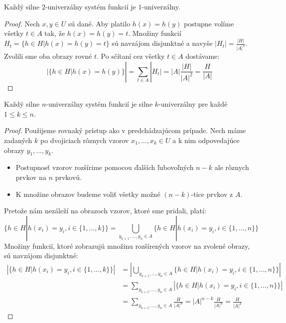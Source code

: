 \begin{remark}
Každý silne $2$-univerzálny systém funkcií je $1$-univerzálny.
\end{remark}
\begin{proof}
Nech $x, y \in U$ sú dané. Aby platilo $h(x) = h(y)$ postupne volíme všetky $t \in A$ tak, že $h(x) = h(y) = t$. Množiny funkcií $H_t = \lbrace h \in H | h(x) = h(y) = t \rbrace$ sú navzájom disjunktné a navyše $|H_t| = \frac{|H|}{{|A|}^{2}}$. Zvolili sme oba obrazy rovné $t$. Po sčítaní cez všetky $t \in A$ dostávame:
\begin{displaymath}
|\lbrace h \in H | h(x) = h(y) \rbrace | = \displaystyle \sum_{t \in A} |H_t| = |A| \frac{|H|}{{|A|}^{2}} = \frac{H}{|A|}
\end{displaymath}
\end{proof}

\begin{remark}
Každý silne $n$-univerzálny systém funkcií je silne $k$-univerzálny pre každé $1 \leq k \leq n$.
\end{remark}
\begin{proof}
Použijeme rovnaký prístup ako v predchádzajúcom prípade. Nech máme zadaných $k$ po dvojiciach rôznych vzorov $x_1, \dots, x_k \in U$ a k nim odpovedajúce obrazy $y_1, \dots, y_k$. 
\begin{itemize}
\item Postupnosť vzorov rozšírime pomocou ďalších ľubovoľných $n - k$ ale rôznych prvkov na $n$ prvkovú. 
\item K množine obrazov budeme voliť všetky možné $(n-k)$-tice prvkov z $A$. 
\end{itemize}
Pretože nám nezáleží na obrazoch vzorov, ktoré sme pridali, platí:
\begin{displaymath}
\lbrace h \in H | h(x_i) = y_i, i \in \lbrace 1, \dots, k \rbrace \rbrace = \displaystyle \bigcup_{y_{k+1}, \dots, y_n \in A} \lbrace h \in H | h(x_i) = y_i, i \in \lbrace 1, \dots, n \rbrace \rbrace
\end{displaymath}
Množiny funkcií, ktoré zobrazujú množinu rozšírených vzorov na zvolené obrazy, sú navzájom disjunktné:
\begin{displaymath}
\begin{split}
\left| \lbrace h \in H | h(x_i) = y_i, i \in \lbrace 1, \dots, k \rbrace \rbrace \right| 
	& = \left| \displaystyle \bigcup_{y_{k+1}, \dots, y_n \in A} \lbrace h \in H | h(x_i) = y_i, i \in \lbrace 1, \dots, n \rbrace \rbrace \right|  \\
	& = \displaystyle \sum_{y_{k+1}, \dots, y_n \in A} \left| \lbrace h \in H | h(x_i) = y_i, i \in \lbrace 1, \dots, n \rbrace \rbrace \right| \\
	& = \displaystyle \sum_{y_{k+1}, \dots, y_n \in A} \frac{H}{{|A|}^{n}} = {|A|}^{n - k} \frac{H}{{|A|}^{n}} = \frac{H}{{|A|}^{k}}
\end{split}
\end{displaymath}
\end{proof}

